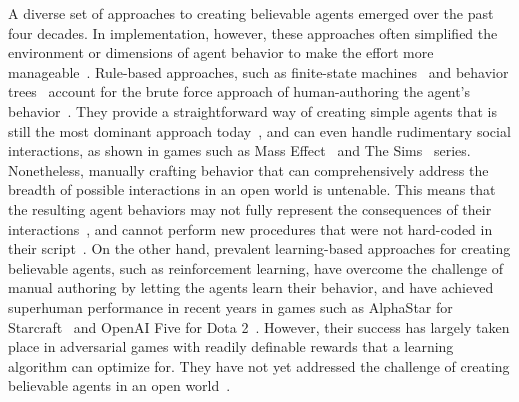 A diverse set of approaches to creating believable agents emerged over the past four decades. In implementation, however, these approaches often simplified the environment or dimensions of agent behavior to make the effort more manageable~\cite{23_brooks2000cog, 39_Minsky1970Draft}. Rule-based approaches, such as finite-state machines~\cite{30_NEURIPS2021_86e8f7ab, 32_Umarov2012Believable} and behavior trees~\cite{45_Knafla2011Introduction, 46_Pillosu2009Coordinating, 47_Hecker2011Spore} account for the brute force approach of human-authoring the agent's behavior~\cite{26_mccoy2012prom}. They provide a straightforward way of creating simple agents that is still the most dominant approach today~\cite{37_McCoy2009Comme, 24_miyashita2017developing, 25_yannakakis2012game}, and can even handle rudimentary social interactions, as shown in games such as Mass Effect~\cite{48_BioWare2007Mass} and The Sims~\cite{49_ElectronicArts2009Sims} series. Nonetheless, manually crafting behavior that can comprehensively address the breadth of possible interactions in an open world is untenable. This means that the resulting agent behaviors may not fully represent the consequences of their interactions~\cite{26_mccoy2012prom, 27_mccoy2011prom, 28_mccoy2011comme}, and cannot perform new procedures that were not hard-coded in their script~\cite{30_NEURIPS2021_86e8f7ab, 32_Umarov2012Believable}. On the other hand, prevalent learning-based approaches for creating believable agents, such as reinforcement learning, have overcome the challenge of manual authoring by letting the agents learn their behavior, and have achieved superhuman performance in recent years in games such as AlphaStar for Starcraft~\cite{50_Vinyals2019Grandmaster} and OpenAI Five for Dota 2~\cite{51_Berner2019Dota}. However, their success has largely taken place in adversarial games with readily definable rewards that a learning algorithm can optimize for. They have not yet addressed the challenge of creating believable agents in an open world~\cite{30_NEURIPS2021_86e8f7ab, 24_miyashita2017developing, 38_Hausknecht2020Interactive}.

